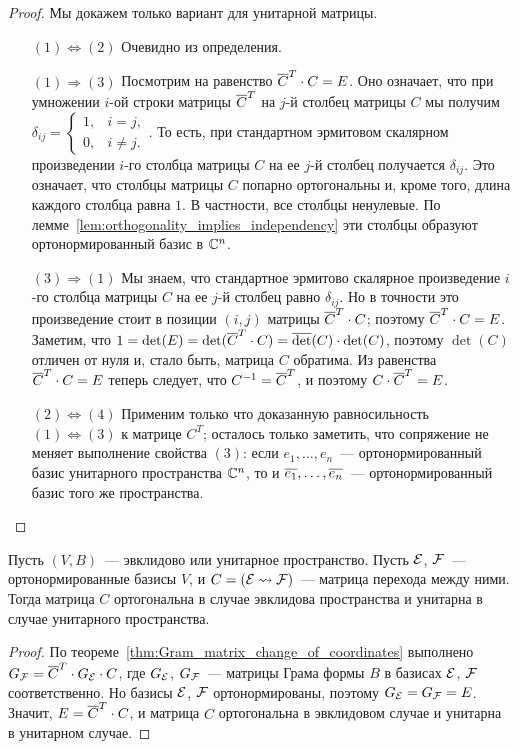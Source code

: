 \begin{proof}
Мы докажем только вариант для унитарной матрицы.
\begin{itemize}
\item[$(1)\Leftrightarrow (2)$] Очевидно из определения.
\item[$(1)\Rightarrow (3)$] Посмотрим на равенство $\overline{C}^T\cdot
  C=E$. Оно означает, что при умножении $i$-ой строки матрицы
  $\overline{C}^T$ на $j$-й столбец матрицы $C$ мы получим
  $\delta_{ij} = \begin{cases}1,&i=j,\\0,&i\neq j.\end{cases}$. То
  есть, при стандартном эрмитовом скалярном произведении $i$-го
  столбца матрицы $C$ на ее $j$-й столбец получается $\delta_{ij}$. Это
  означает, что столбцы матрицы $C$ попарно ортогональны и, кроме того,
  длина каждого столбца равна $1$. В частности, все столбцы
  ненулевые. По лемме~\ref{lem:orthogonality_implies_independency} эти
  столбцы образуют ортонормированный базис в $\mathbb C^n$.
\item[$(3)\Rightarrow (1)$] Мы знаем, что стандартное эрмитово
  скалярное произведение $i$-го столбца матрицы $C$ на ее $j$-й
  столбец равно $\delta_{ij}$. Но в точности это произведение стоит в
  позиции $(i,j)$ матрицы $\overline{C}^T\cdot C$; поэтому $\overline{C}^T\cdot C
  = E$. Заметим, что $1 = \det(E) = \det(\overline{C}^T\cdot C) =
  \overline\det(C)\cdot\det(C)$, поэтому $\det(C)$ отличен от нуля и, стало
  быть, матрица $C$ обратима. Из равенства $\overline{C}^T\cdot C = E$
  теперь следует, что $C^{-1} = \overline{C}^T$, и поэтому $C\cdot\overline{C}^T =
  E$.
\item[$(2)\Leftrightarrow (4)$] Применим только что доказанную
  равносильность $(1)\Leftrightarrow (3)$ к матрице $C^T$; осталось
  только заметить, что сопряжение не меняет выполнение свойства $(3)$:
  если $e_1,\dots,e_n$~--- ортонормированный базис унитарного
  пространства $\mathbb C^n$, то и $\overline{e_1},\dots,\overline{e_n}$~---
  ортонормированный базис того же пространства.
\end{itemize}
\end{proof}

\begin{theorem}
Пусть $(V,B)$~--- эвклидово или унитарное пространство.
Пусть $\mathcal E$, $\mathcal F$~--- ортонормированные базисы $V$, и
$C=(\mathcal E\rightsquigarrow\mathcal F)$~--- матрица перехода между ними. Тогда матрица
$C$ ортогональна в случае эвклидова пространства и унитарна в случае
унитарного пространства.
\end{theorem}
\begin{proof}
По теореме~\ref{thm:Gram_matrix_change_of_coordinates} выполнено
$G_{\mathcal F} = \overline{C}^T\cdot G_{\mathcal E}\cdot C$, где
$G_{\mathcal E}$, $G_{\mathcal F}$~--- матрицы Грама формы $B$ в базисах $\mathcal E$,
$\mathcal F$ соответственно. Но базисы $\mathcal E$, $\mathcal F$ ортонормированы,
поэтому $G_{\mathcal E} = G_{\mathcal F} = E$. Значит, $E = \overline{C}^T\cdot C$, и
матрица $C$ ортогональна в эвклидовом случае и унитарна в унитарном
случае.
\end{proof}

